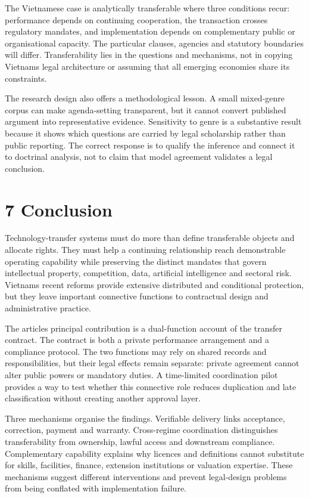 \documentclass[
]{article}
\begin{document}
The Vietnamese case is analytically transferable where three conditions
recur: performance depends on continuing cooperation, the transaction
crosses regulatory mandates, and implementation depends on complementary
public or organisational capacity. The particular clauses, agencies and
statutory boundaries will differ. Transferability lies in the questions
and mechanisms, not in copying Vietnam\textquotesingle s legal
architecture or assuming that all emerging economies share its
constraints.

The research design also offers a methodological lesson. A small
mixed-genre corpus can make agenda-setting transparent, but it cannot
convert published argument into representative evidence. Sensitivity to
genre is a substantive result because it shows which questions are
carried by legal scholarship rather than public reporting. The correct
response is to qualify the inference and connect it to doctrinal
analysis, not to claim that model agreement validates a legal
conclusion.

\section{7 Conclusion}\label{conclusion}

Technology-transfer systems must do more than define transferable
objects and allocate rights. They must help a continuing relationship
reach demonstrable operating capability while preserving the distinct
mandates that govern intellectual property, competition, data,
artificial intelligence and sectoral risk. Vietnam\textquotesingle s
recent reforms provide extensive distributed and conditional protection,
but they leave important connective functions to contractual design and
administrative practice.

The article\textquotesingle s principal contribution is a dual-function
account of the transfer contract. The contract is both a private
performance arrangement and a compliance protocol. The two functions may
rely on shared records and responsibilities, but their legal effects
remain separate: private agreement cannot alter public powers or
mandatory duties. A time-limited coordination pilot provides a way to
test whether this connective role reduces duplication and late
classification without creating another approval layer.

Three mechanisms organise the findings. Verifiable delivery links
acceptance, correction, payment and warranty. Cross-regime coordination
distinguishes transferability from ownership, lawful access and
downstream compliance. Complementary capability explains why licences
and definitions cannot substitute for skills, facilities, finance,
extension institutions or valuation expertise. These mechanisms suggest
different interventions and prevent legal-design problems from being
conflated with implementation failure.
\end{document}
